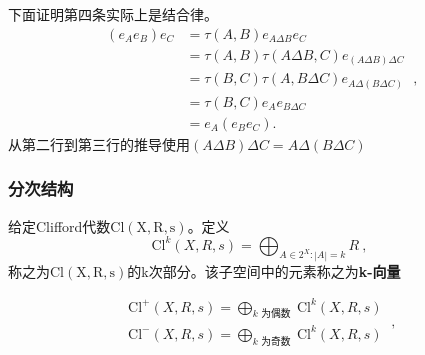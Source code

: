 下面证明第四条实际上是结合律。
\begin{equation}
\begin{aligned}
\left(e_A e_B\right) e_C & =\tau(A, B) e_{A \Delta B} e_C \\
& =\tau(A, B) \tau(A \Delta B, C) e_{(A \Delta B) \Delta C} \\
& =\tau(B, C) \tau(A, B \Delta C) e_{A \Delta(B \Delta C)} \\
& =\tau(B, C) e_A e_{B \Delta C} \\
& =e_A\left(e_B e_C\right) .
\end{aligned}~,
\end{equation}
从第二行到第三行的推导使用$(A \Delta B) \Delta C=A \Delta(B \Delta C)$
\subsubsection{分次结构}
\begin{definition}{}
给定Clifford代数$\mathrm {Cl(X,R,s)}$。定义
\begin{equation}
\mathrm{Cl}^k(X,R,s)=\bigoplus_{A \in 2^X:|A|=k}R~,
\end{equation}
称之为$\mathrm {Cl(X,R,s)}$的k次部分。该子空间中的元素称之为\textbf{k-向量}
\end{definition}
\begin{definition}{}
\begin{equation}
\begin{array}{l}
\mathrm{Cl}^{+}(X, R, s)=\bigoplus_{k \text { 为偶数 }} \mathrm{Cl}^k(X, R, s) \\
\mathrm{Cl}^{-}(X, R, s)=\bigoplus_{k \text { 为奇数 }} \mathrm{Cl}^k(X, R, s)
\end{array}~,
\end{equation}
\end{definition}






